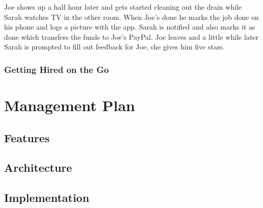 \documentclass[11pt]{article}
\begin{document}
Joe shows up a half hour later and gets started cleaning out the drain while Sarah watches TV in the other room. When Joe's done he marks the job done on his phone and logs a picture with the app. Sarah is notified and also marks it as done which transfers the funds to Joe's PayPal. Joe leaves and a little while later Sarah is prompted to fill out feedback for Joe, she gives him five stars.

\subsubsection{Getting Hired on the Go}



%
\section{Management Plan}\label{management-plan}

\subsection{Features}


\subsection{Architecture}


\subsection{Implementation}
\end{document}
